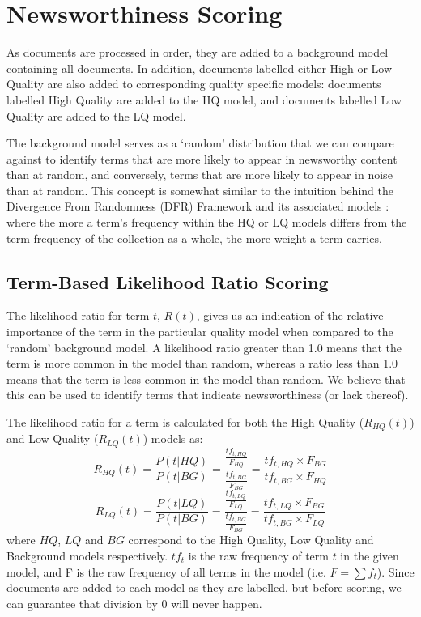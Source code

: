 
\section{Newsworthiness Scoring}
\label{scoring:sec:scoring}

As documents are processed in order, they are added to a background model containing all documents.
In addition, documents labelled either High or Low Quality are also added to corresponding quality specific models: documents labelled High Quality are added to the HQ model, and documents labelled Low Quality are added to the LQ model.

The background model serves as a `random' distribution that we can compare against to identify terms that are more likely to appear in newsworthy content than at random, and conversely, terms that are more likely to appear in noise than at random.
This concept is somewhat similar to the intuition behind the Divergence From Randomness (DFR) Framework and its associated models \citep{Amati02}: where the more a term's frequency within the HQ or LQ models differs from the term frequency of the collection as a whole, the more weight a term carries.

\subsection{Term-Based Likelihood Ratio Scoring}
\label{sec:scoring:likelihoodRatio}
The likelihood ratio for term \(t\), \(R(t)\), gives us an indication of the relative importance of the term in the particular quality model when compared to the `random' background model.
A likelihood ratio greater than 1.0 means that the term is more common in the model than random, whereas a ratio less than 1.0 means that the term is less common in the model than random.
We believe that this can be used to identify terms that indicate newsworthiness (or lack thereof).

The likelihood ratio for a term is calculated for both the High Quality (\(R_{HQ}(t)\)) and Low Quality (\(R_{LQ}(t)\)) models as:
\begin{displaymath}
	R_{HQ}(t) =
	\frac{
		P(t|HQ)
	}{
		P(t|BG)
	} =
	\frac{
		\frac{tf_{t,HQ}}{F_{HQ}}
	}{
		\frac{tf_{t,BG}}{F_{BG}}
	} =
	\frac{
		tf_{t,HQ} \times F_{BG}
	} {
		tf_{t,BG} \times F_{HQ}
	}
\end{displaymath}
\begin{displaymath}
	R_{LQ}(t) =
	\frac{
		P(t|LQ)
	}{
		P(t|BG)
	} =
	\frac{
		\frac{tf_{t,LQ}}{F_{LQ}}
	}{
		\frac{tf_{t,BG}}{F_{BG}}
	} =
	\frac{
		tf_{t,LQ} \times F_{BG}
	} {
		tf_{t,BG} \times F_{LQ}
	}
\end{displaymath}
where \(HQ\), \(LQ\) and \(BG\) correspond to the High Quality, Low Quality and Background models respectively. \(tf_t\) is the raw frequency of term  \(t\) in the given model, and F is the raw frequency of all terms in the model (i.e.  \(F = \sum{f_t}\)). Since documents are added to each model as they are labelled, but before scoring, we can guarantee that division by 0 will never happen.

